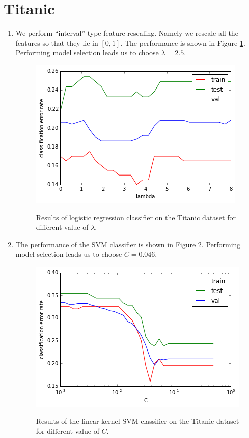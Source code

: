 \documentclass[10pt]{article}
\begin{document}
\section{Titanic}

\begin{enumerate}
\item We perform ``interval'' type feature rescaling. Namely we rescale all the features so that they lie in $[0,1]$. The performance is shown in Figure \ref{titanic_logit}. Performing model selection leads us to choose $\lambda = 2.5$.
 \begin{figure}
 \centering
 \includegraphics[scale=0.5]{titanic_logit.png}
 \label{titanic_logit}
 \caption{Results of logistic regression classifier on the Titanic dataset for different value of $\lambda$.}
 \end{figure}
 


 \item The performance of the SVM classifier is shown in Figure \ref{titanic_svm}.  Performing model selection leads us to choose $C=0.046$,
 
   \begin{figure}
 \centering
 \includegraphics[scale=0.5]{titanic_svm.png}
 \label{titanic_svm}
 \caption{Results of the linear-kernel SVM classifier on the Titanic dataset for different value of $C$.}
 \end{figure}


\end{enumerate}
\end{document}
